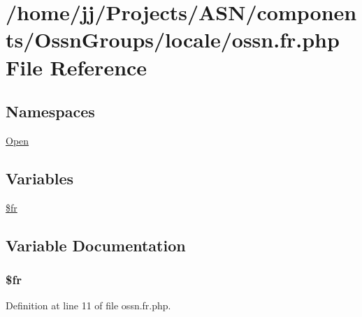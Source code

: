 \hypertarget{components_2_ossn_groups_2locale_2ossn_8fr_8php}{}\section{/home/jj/\+Projects/\+A\+S\+N/components/\+Ossn\+Groups/locale/ossn.fr.\+php File Reference}
\label{components_2_ossn_groups_2locale_2ossn_8fr_8php}
\subsection*{Namespaces}
\begin{DoxyCompactItemize}
\item 
 \hyperlink{namespace_open}{Open}
\end{DoxyCompactItemize}
\subsection*{Variables}
\begin{DoxyCompactItemize}
\item 
\hyperlink{components_2_ossn_groups_2locale_2ossn_8fr_8php_ad5107c697816e7b7f89ad1b3e94e3e0e}{\$fr}
\end{DoxyCompactItemize}


\subsection{Variable Documentation}
\subsubsection[{\texorpdfstring{\$fr}{$fr}}]{\setlength{\rightskip}{0pt plus 5cm}\$fr}\hypertarget{components_2_ossn_groups_2locale_2ossn_8fr_8php_ad5107c697816e7b7f89ad1b3e94e3e0e}{}\label{components_2_ossn_groups_2locale_2ossn_8fr_8php_ad5107c697816e7b7f89ad1b3e94e3e0e}


Definition at line 11 of file ossn.\+fr.\+php.

